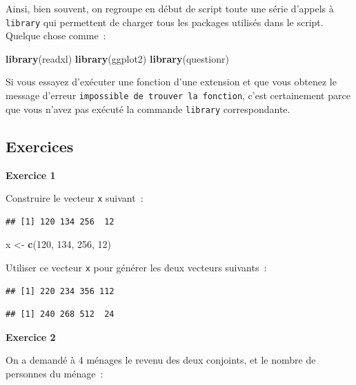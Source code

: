 \documentclass[12pt,]{book}
\newenvironment{Shaded}{\begin{snugshade}}{\end{snugshade}}
\newcommand{\DecValTok}[1]{\textcolor[rgb]{0.00,0.00,0.81}{#1}}
\newcommand{\KeywordTok}[1]{\textcolor[rgb]{0.13,0.29,0.53}{\textbf{#1}}}
\newcommand{\NormalTok}[1]{#1}
\newcommand{\StringTok}[1]{\textcolor[rgb]{0.31,0.60,0.02}{#1}}
\begin{document}
Ainsi, bien souvent, on regroupe en début de script toute une série d'appels à \texttt{library} qui permettent de charger tous les packages utilisés dans le script. Quelque chose comme~:

\begin{Shaded}
\begin{Highlighting}[]
\KeywordTok{library}\NormalTok{(readxl)}
\KeywordTok{library}\NormalTok{(ggplot2)}
\KeywordTok{library}\NormalTok{(questionr)}
\end{Highlighting}
\end{Shaded}

Si vous essayez d'exécuter une fonction d'une extension et que vous obtenez le message d'erreur \texttt{impossible\ de\ trouver\ la\ fonction}, c'est certainement parce que vous n'avez pas exécuté la commande \texttt{library} correspondante.

\hypertarget{ex-introR}{%
\subsection{Exercices}\label{ex-introR}}

\textbf{Exercice 1}

Construire le vecteur \texttt{x} suivant~:

\begin{verbatim}
## [1] 120 134 256  12
\end{verbatim}

\begin{Shaded}
\begin{Highlighting}[]
\NormalTok{x <-}\StringTok{ }\KeywordTok{c}\NormalTok{(}\DecValTok{120}\NormalTok{, }\DecValTok{134}\NormalTok{, }\DecValTok{256}\NormalTok{, }\DecValTok{12}\NormalTok{)}
\end{Highlighting}
\end{Shaded}

Utiliser ce vecteur \texttt{x} pour générer les deux vecteurs suivants~:

\begin{verbatim}
## [1] 220 234 356 112
\end{verbatim}

\begin{verbatim}
## [1] 240 268 512  24
\end{verbatim}

\textbf{Exercice 2}

On a demandé à 4 ménages le revenu des deux conjoints, et le nombre de personnes du ménage~:
\end{document}
